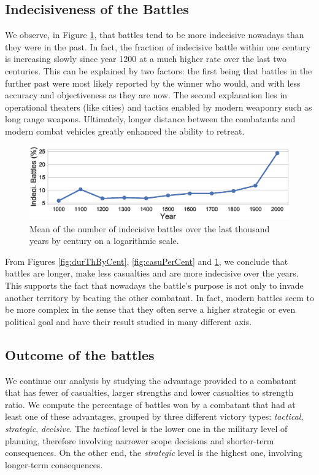 \subsection{Indecisiveness of the Battles}

We observe, in Figure \ref{fig:IndecBattles}, that battles tend to be more indecisive nowadays than they were in the past. In fact, the fraction of indecisive battle within one century is increasing slowly since year 1200 at a much higher rate over the last two centuries. This can be explained by two factors: the first being that battles in the further past were most likely reported by the winner who would, and with less accuracy and objectiveness as they are now. The second explanation lies in operational theaters (like cities) and tactics enabled by modern weaponry such as long range weapons. Ultimately, longer distance between the combatants and modern combat vehicles greatly enhanced the ability to retreat.

 \begin{figure}[h]
	\centering	\includegraphics[width=\linewidth]{figures/indThByCent}
	\caption{Mean of the number of indecisive battles over the last thousand years by century on a logarithmic scale.}\label{fig:IndecBattles}
	\centering
\end{figure}

From Figures \ref{fig:durThByCent}, \ref{fig:casuPerCent} and \ref{fig:IndecBattles}, we conclude that battles are longer, make less casualties and are more indecisive over the years. This supports the fact that nowadays the battle's purpose is not only to invade another territory by beating the other combatant. In fact, modern battles seem to be more complex in the sense that they often serve a higher strategic or even political goal and have their result studied in many different axis.

\subsection{Outcome of the battles}

We continue our analysis by studying the advantage provided to a combatant that has fewer of casualties, larger strengths  and  lower casualties to strength ratio. We compute the percentage of battles won by a combatant that had at least one of these advantages, grouped by three different victory types: \textit{tactical}, \textit{strategic},  \textit{decisive}. The \textit{tactical} level is the lower one in the military level of planning\cite{military_planning}, therefore involving narrower scope decisions and shorter-term consequences. On the other end, the \textit{strategic} level is the highest one, involving longer-term
consequences.

